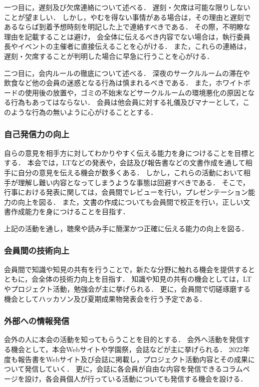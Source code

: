 一つ目に，遅刻及び欠席連絡について述べる．
遅刻・欠席は可能な限りしないことが望ましい．
しかし，やむを得ない事情がある場合は，その理由と遅刻であるならば到着予想時刻を明記した上で連絡すべきである．
その際，不明瞭な理由を記載することは避け，
会全体に伝えるべき内容でない場合は，執行委員長やイベントの主催者に直接伝えることを心がける．
また，これらの連絡は，遅刻・欠席することが判明した場合に早急に行うことを心がける．

二つ目に，会内ルールの徹底について述べる．
深夜のサークルルームの滞在や飲食など他の会員の迷惑となる行為は慎まれるべきである．
また，ホワイトボードの使用後の放置や，ゴミの不始末などサークルルームの環境悪化の原因となる行為もあってはならない．
会員は他会員に対する礼儀及びマナーとして，このような行為の無いように心がけることとする．

\subsubsection*{自己発信力の向上}
自らの意見を相手方に対してわかりやすく伝える能力を身につけることを目標とする．
本会では，LTなどの発表や，会誌及び報告書などの文書作成を通して相手に自分の意見を伝える機会が数多くある．
しかし，これらの活動において相手が理解し難い内容となってしまうような事態は回避すべきである．
そこで，行事における発表に関しては，会員間でレビューを行い，プレゼンテーション能力の向上を図る．
また，文書の作成についても会員間で校正を行い，正しい文書作成能力を身につけることを目指す．

上記の活動を通し，聴衆や読み手に簡潔かつ正確に伝える能力の向上を図る．

\subsubsection*{会員間の技術向上}
会員間で知識や知見の共有を行うことで，新たな分野に触れる機会を提供するとともに，会全体の技術力向上を目指す．
知識や知見の共有の機会としては，LTやプロジェクト活動，勉強会が主に挙げられる．
更に，会員間で切磋琢磨する機会としてハッカソン及び夏期成果物発表会を行う予定である．

\subsubsection*{外部への情報発信}
会外の人に本会の活動を知ってもらうことを目的とする．
会外へ活動を発信する機会として，本会Webサイトや学園祭，会誌などが主に挙げられる．
2022年度も報告書をWebサイト及び会誌に掲載し，プロジェクト活動内容とその成果について発信していく．
更に，会誌に各会員が自由な内容を発信できるコラムページを設け，各会員個人が行っている活動についても発信する機会を設ける．


